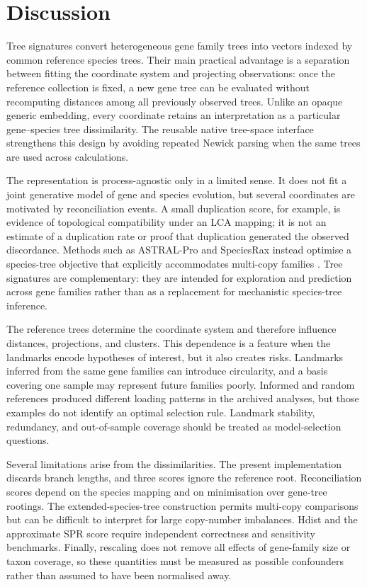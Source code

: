 \section{Discussion}

Tree signatures convert heterogeneous gene family trees into vectors indexed by common reference species trees. Their
main practical advantage is a separation between fitting the coordinate system and projecting observations: once the
reference collection is fixed, a new gene tree can be evaluated without recomputing distances among all previously
observed trees. Unlike an opaque generic embedding, every coordinate retains an interpretation as a particular
gene--species tree dissimilarity. The reusable native tree-space interface strengthens this design by avoiding repeated
Newick parsing when the same trees are used across calculations.

The representation is process-agnostic only in a limited sense. It does not fit a joint generative model of gene and
species evolution, but several coordinates are motivated by reconciliation events. A small duplication score, for
example, is evidence of topological compatibility under an LCA mapping; it is not an estimate of a duplication rate or
proof that duplication generated the observed discordance. Methods such as ASTRAL-Pro and SpeciesRax instead optimise a
species-tree objective that explicitly accommodates multi-copy families \citep{astral-pro,Morel2022SpeciesRax}. Tree
signatures are complementary: they are intended for exploration and prediction across gene families rather than as a
replacement for mechanistic species-tree inference.

The reference trees determine the coordinate system and therefore influence distances, projections, and clusters. This
dependence is a feature when the landmarks encode hypotheses of interest, but it also creates risks. Landmarks inferred
from the same gene families can introduce circularity, and a basis covering one sample may represent future families
poorly. Informed and random references produced different loading patterns in the archived analyses, but those examples
do not identify an optimal selection rule. Landmark stability, redundancy, and out-of-sample coverage should be treated
as model-selection questions.

Several limitations arise from the dissimilarities. The present implementation discards branch lengths, and three
scores ignore the reference root. Reconciliation scores depend on the species mapping and on minimisation over gene-tree
rootings. The extended-species-tree construction permits multi-copy comparisons but can be difficult to interpret for
large copy-number imbalances. Hdist and the approximate SPR score require independent correctness and sensitivity
benchmarks. Finally, rescaling does not remove all effects of gene-family size or taxon coverage, so these quantities
must be measured as possible confounders rather than assumed to have been normalised away.

